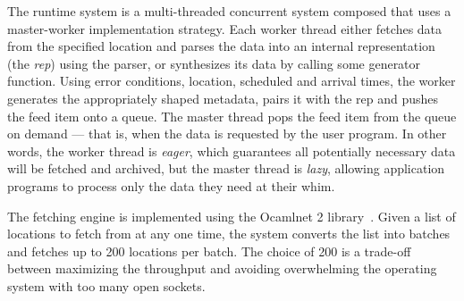 The \padsd{} runtime system is a multi-threaded concurrent
system composed that uses a master-worker implementation strategy. 
Each worker thread either fetches data from the specified
location and parses the data into an internal representation (the {\em rep})
using the \padsml{} parser, or synthesizes its data by calling some 
generator function.  Using error conditions, location, scheduled
and arrival times, the worker generates the appropriately shaped metadata,
pairs it with the rep and pushes the feed item onto a queue. 
The master thread pops the feed item from the queue on demand --- that is,
when the data is requested by the user program. In other words,
the worker thread is {\em eager}, which guarantees all potentially 
necessary data will be fetched and archived, but the master thread is 
{\em lazy}, allowing application programs to process only the data they
need at their whim.

The fetching engine is implemented using
the Ocamlnet 2 library~\cite{ocamlnet2}. 
Given a list of locations to fetch from at any one time, 
the system converts the list into batches and fetches up to 200 locations
per batch. The choice of 200 is a trade-off between maximizing
the throughput and avoiding overwhelming the operating system
with too many open sockets. 


 
